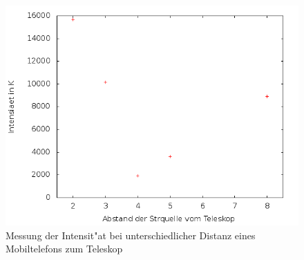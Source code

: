 \begin{figure}
\includegraphics[width=.8\textwidth]{images/stoer}
\caption{Messung der Intensit"at bei unterschiedlicher Distanz eines Mobiltelefons zum Teleskop}
\label{plot:stoer}
\end{figure}
 
